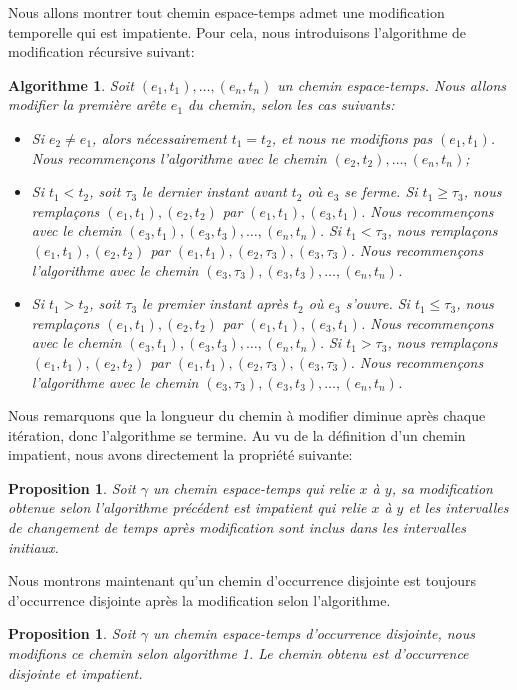 \documentclass[titlepage,a4paper,12pt]{article}
\newcounter{d}
\newcounter{t}
\newcounter{p}
\newcounter{c}
\newcounter{a}
\newcounter{l}
\newtheorem{prop}[p]{Proposition}
\newtheorem{algo}[a]{Algorithme}
\begin{document}
Nous allons montrer tout chemin espace-temps admet une modification temporelle qui est impatiente. Pour cela, nous introduisons l'algorithme de modification récursive suivant:
\begin{algo} Soit $(e_1,t_1),\dots,(e_n,t_n)$ un chemin espace-temps. Nous allons modifier la première arête $e_1$ du chemin, selon les cas suivants:
\begin{itemize}[label = $\bullet$, leftmargin = *]
\item Si $e_2 \neq e_1$, alors nécessairement $t_1 = t_2$, et nous ne modifions pas $(e_1,t_1)$. Nous recommençons l'algorithme avec le chemin $(e_2,t_2),\dots,(e_n,t_n)$;
\item  Si $t_1< t_2$, soit $\tau_3$ le dernier instant avant $t_2$ où $e_{3}$ se ferme. Si $t_1 \geqslant \tau_3$, nous remplaçons $(e_1,t_1),(e_2,t_2)$ par $(e_1,t_1),(e_3,t_1)$. Nous recommençons avec le chemin $(e_3,t_1),(e_3,t_3),\dots, (e_n,t_n)$. Si $t_1 < \tau_3$, nous remplaçons $(e_1,t_1),(e_2,t_2)$ par $(e_1,t_1),(e_2,\tau_3),(e_3,\tau_3)$. Nous recommençons l'algorithme avec le chemin $(e_3,\tau_3),(e_3,t_3),\dots,(e_n,t_n)$.
\item Si $t_1 > t_2$, soit $\tau_3$ le premier instant après $t_2$ où $e_{3}$ s'ouvre. Si $t_1 \leqslant \tau_3$, nous remplaçons $(e_1,t_1),(e_2,t_2)$ par $(e_1,t_1),(e_3,t_1)$. Nous recommençons avec le chemin $(e_3,t_1),(e_3,t_3),\dots, (e_n,t_n)$. Si $t_1 > \tau_3$, nous remplaçons $(e_1,t_1),(e_2,t_2)$ par $(e_1,t_1),(e_2,\tau_3),(e_3,\tau_3)$. Nous recommençons l'algorithme avec le chemin $(e_3,\tau_3),(e_3,t_3),\dots,(e_n,t_n)$.
\end{itemize}
\end{algo}
Nous remarquons que la longueur du chemin à modifier diminue après chaque itération, donc l'algorithme se termine. Au vu de la définition d'un chemin impatient, nous avons directement la propriété suivante:
\begin{prop}
Soit $\gamma$ un chemin espace-temps qui relie $x$ à $y$, sa modification obtenue selon l'algorithme précédent est impatient qui relie $x$ à $y$ et les intervalles de changement de temps après modification sont inclus dans les intervalles initiaux.
\end{prop}
Nous montrons maintenant qu'un chemin d'occurrence disjointe est toujours d'occurrence disjointe après la modification selon l'algorithme.
\begin{prop} Soit $\gamma$ un chemin espace-temps d'occurrence disjointe, nous modifions ce chemin selon algorithme 1. Le chemin obtenu est d'occurrence disjointe et impatient.
\end{prop}
\end{document}
